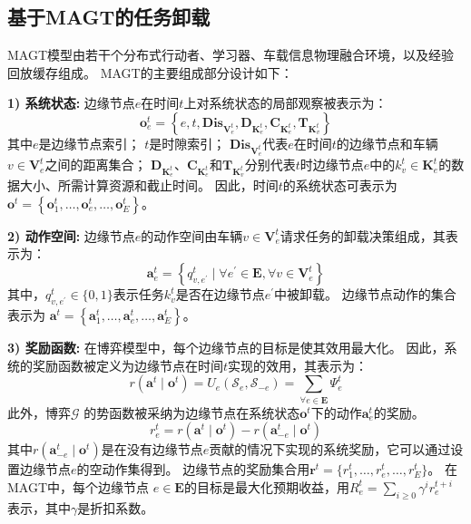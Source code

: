 \subsection[\hspace{-2pt}基于MAGT的任务卸载]{{ \hspace{-8pt}基于MAGT的任务卸载}}
MAGT模型由若干个分布式行动者、学习器、车载信息物理融合环境，以及经验回放缓存组成。
MAGT的主要组成部分设计如下：

\textbf{1) 系统状态:} 边缘节点$e$在时间$t$上对系统状态的局部观察被表示为：
	\begin{equation}
		\boldsymbol{o}_{e}^{t}=\left\{e, t, \mathbf{Dis}_{\mathbf{V}_{e}^{t}}, \mathbf{D}_{\mathbf{K}_{e}^{t}}, \mathbf{C}_{\mathbf{K}_{e}^{t}}, \mathbf{T}_{\mathbf{K}_{v}^{t}}\right\}
	\end{equation} 
	\noindent 其中$e$是边缘节点索引；
	$t$是时隙索引；
	$\mathbf{Dis}_{\mathbf{V}_{e}^{t}}$代表$e$在时间$t$的边缘节点和车辆$v \in \mathbf{V}_{e}^{t}$之间的距离集合；
	$\mathbf{D}_{\mathbf{K}_{e}^{t}}$、$\mathbf{C}_{\mathbf{K}_{e}^{t}}$和$\mathbf{T}_{\mathbf{K}_{v}^{t}}$分别代表$t$时边缘节点$e$中的$k_{v}^{t} \in \mathbf{K}_{e}^{t}$的数据大小、所需计算资源和截止时间。
	因此，时间$t$的系统状态可表示为$\boldsymbol{o}^{t}=\left\{\boldsymbol{o}_{1}^{t}, \ldots, \boldsymbol{o}_{e}^{t}, \ldots, \boldsymbol{o}_{E}^{t}\right\}$。

\textbf{2) 动作空间:} 边缘节点$e$的动作空间由车辆$v \in \mathbf{V}_{e}^{t}$请求任务的卸载决策组成，其表示为：
	\begin{equation}
		\boldsymbol{a}_{e}^{t} = \left\{ q_{v, e^{\prime}}^t \mid \forall e^{\prime} \in \mathbf{E}, \forall v \in \mathbf{V}_{e}^{t} \right\}
	\end{equation}
	\noindent 其中，$q_{v, e^{\prime}}^t \in \{0, 1\}$表示任务$k_{v}^t$是否在边缘节点$e^{\prime}$中被卸载。
	边缘节点动作的集合表示为 $\boldsymbol{a}^{t} = \left\{\boldsymbol{a}_{1}^{t}, \ldots, \boldsymbol{a}_{e}^{t}, \ldots, \boldsymbol{a}_{E}^{t}\right\}$。
	
\textbf{3) 奖励函数:} 在博弈模型中，每个边缘节点的目标是使其效用最大化。
	因此，系统的奖励函数被定义为边缘节点在时间$t$实现的效用，其表示为：
	\begin{equation}
		r\left(\boldsymbol{a}^{t} \mid \boldsymbol{o}^{t}\right)= {U}_{e}\left(\mathcal{S}_{e}, \mathcal{S}_{-e}\right) = \sum_{\forall e \in \mathbf{E}} \Psi_{e}^{t}
		\label{equ 3-32}
	\end{equation}
	此外，博弈$\mathcal{G}$ 的势函数被采纳为边缘节点在系统状态$\boldsymbol{o}^{t}$下的动作$\boldsymbol{a}_{e}^{t}$的奖励。
	\begin{equation}
		r_{e}^{t} = r\left(\boldsymbol{a}^{t} \mid \boldsymbol{o}^{t}\right)-r\left(\boldsymbol{a}_{-e}^{t} \mid \boldsymbol{o}^{t}\right)
		\label{equ 3-33}
	\end{equation}
	\noindent 其中$r\left(\boldsymbol{a}_{-e}^{t} \mid \boldsymbol{o}^{t}\right)$是在没有边缘节点$e$贡献的情况下实现的系统奖励，它可以通过设置边缘节点$e$的空动作集得到。
	边缘节点的奖励集合用$\boldsymbol{r}^{t} = \{r_{1}^{t}, \ldots, r_{e}^{t}, \ldots, r_{E}^{t}\}$。
	在MAGT中，每个边缘节点 $e \in \mathbf{E}$的目标是最大化预期收益，用$R_{e}^{t} = \sum_{i \geq 0} \gamma^{i} r_{e}^{t+i}$表示，其中$\gamma$是折扣系数。

